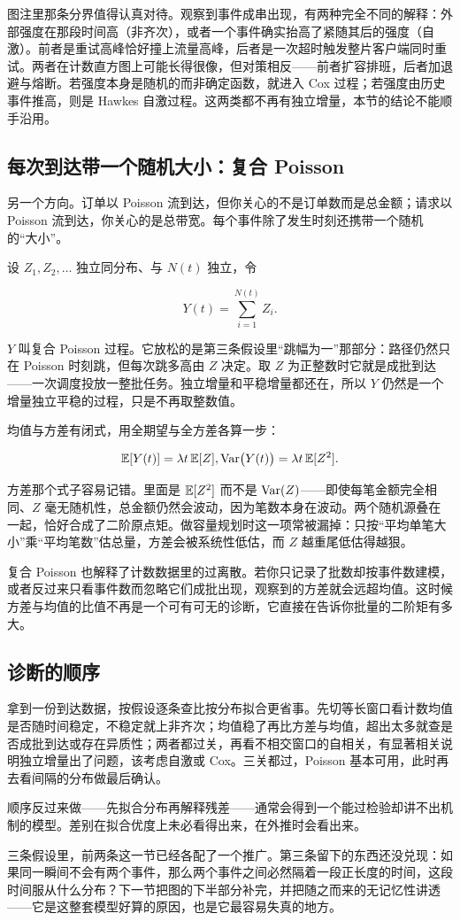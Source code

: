 图注里那条分界值得认真对待。观察到事件成串出现，有两种完全不同的解释：外部强度在那段时间高（非齐次），或者一个事件确实抬高了紧随其后的强度（自激）。前者是重试高峰恰好撞上流量高峰，后者是一次超时触发整片客户端同时重试。两者在计数直方图上可能长得很像，但对策相反——前者扩容排班，后者加退避与熔断。若强度本身是随机的而非确定函数，就进入 Cox 过程；若强度由历史事件推高，则是 Hawkes 自激过程。这两类都不再有独立增量，本节的结论不能顺手沿用。

\subsection{每次到达带一个随机大小：复合 Poisson}

另一个方向。订单以 Poisson 流到达，但你关心的不是订单数而是总金额；请求以 Poisson 流到达，你关心的是总带宽。每个事件除了发生时刻还携带一个随机的``大小''。

设 \(Z_1,Z_2,\ldots\) 独立同分布、与 \(N(t)\) 独立，令

\[
Y(t)=\sum_{i=1}^{N(t)}Z_i.
\]

\(Y\) 叫复合 Poisson 过程。它放松的是第三条假设里``跳幅为一''那部分：路径仍然只在 Poisson 时刻跳，但每次跳多高由 \(Z\) 决定。取 \(Z\) 为正整数时它就是成批到达——一次调度投放一整批任务。独立增量和平稳增量都还在，所以 \(Y\) 仍然是一个增量独立平稳的过程，只是不再取整数值。

均值与方差有闭式，用全期望与全方差各算一步：

\[
\mathbb{E}[Y(t)]=\lambda t\,\mathbb{E}[Z],
\space
\operatorname{Var}\bigl(Y(t)\bigr)=\lambda t\,\mathbb{E}[Z^2].
\]

方差那个式子容易记错。里面是 \(\mathbb{E}[Z^2]\) 而不是 \(\operatorname{Var}(Z)\)——即使每笔金额完全相同、\(Z\) 毫无随机性，总金额仍然会波动，因为笔数本身在波动。两个随机源叠在一起，恰好合成了二阶原点矩。做容量规划时这一项常被漏掉：只按``平均单笔大小''乘``平均笔数''估总量，方差会被系统性低估，而 \(Z\) 越重尾低估得越狠。

复合 Poisson 也解释了计数数据里的过离散。若你只记录了批数却按事件数建模，或者反过来只看事件数而忽略它们成批出现，观察到的方差就会远超均值。这时候方差与均值的比值不再是一个可有可无的诊断，它直接在告诉你批量的二阶矩有多大。

\subsection{诊断的顺序}

拿到一份到达数据，按假设逐条查比按分布拟合更省事。先切等长窗口看计数均值是否随时间稳定，不稳定就上非齐次；均值稳了再比方差与均值，超出太多就查是否成批到达或存在异质性；两者都过关，再看不相交窗口的自相关，有显著相关说明独立增量出了问题，该考虑自激或 Cox。三关都过，Poisson 基本可用，此时再去看间隔的分布做最后确认。

顺序反过来做——先拟合分布再解释残差——通常会得到一个能过检验却讲不出机制的模型。差别在拟合优度上未必看得出来，在外推时会看出来。

三条假设里，前两条这一节已经各配了一个推广。第三条留下的东西还没兑现：如果同一瞬间不会有两个事件，那么两个事件之间必然隔着一段正长度的时间，这段时间服从什么分布？下一节把图的下半部分补完，并把随之而来的无记忆性讲透——它是这整套模型好算的原因，也是它最容易失真的地方。
